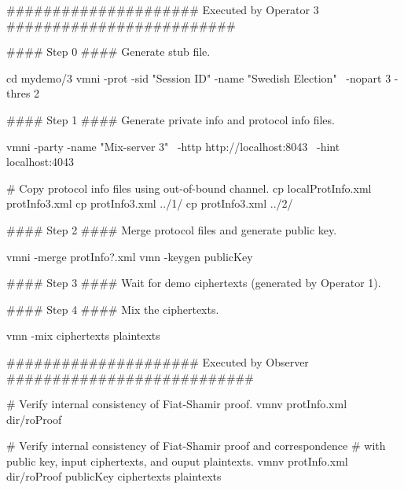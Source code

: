 ##################### Executed by Operator 3 #########################

#### Step 0 #### Generate stub file.

cd mydemo/3
vmni -prot -sid "Session ID" -name "Swedish Election" \
     -nopart 3 -thres 2

#### Step 1 #### Generate private info and protocol info files.

vmni -party -name "Mix-server 3" \
-http http://localhost:8043 \
-hint localhost:4043

# Copy protocol info files using out-of-bound channel.
cp localProtInfo.xml protInfo3.xml
cp protInfo3.xml ../1/
cp protInfo3.xml ../2/

#### Step 2 #### Merge protocol files and generate public key.

vmni -merge protInfo?.xml
vmn -keygen publicKey

#### Step 3 #### Wait for demo ciphertexts (generated by Operator 1).

#### Step 4 #### Mix the ciphertexts.

vmn -mix ciphertexts plaintexts


##################### Executed by Observer ###########################

# Verify internal consistency of Fiat-Shamir proof.
vmnv protInfo.xml dir/roProof

# Verify internal consistency of Fiat-Shamir proof and correspondence
# with public key, input ciphertexts, and ouput plaintexts.
vmnv protInfo.xml dir/roProof publicKey ciphertexts plaintexts
